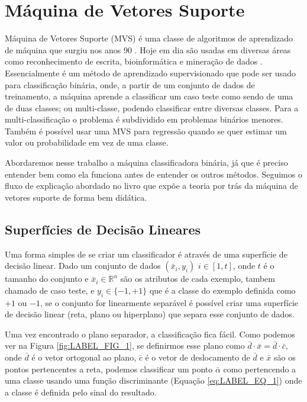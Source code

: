 \chapter{Máquina de Vetores Suporte}\label{chp:LABEL_CHP_2}


Máquina de Vetores Suporte (MVS) é uma classe de algoritmos de aprendizado de máquina que surgiu nos anos 90 \cite{cortes1995support}. Hoje em dia são usadas em diversas áreas como reconhecimento de escrita, bioinformática e mineração de dados \cite{defilippo2004maquinas}. Essencialmente é um método de aprendizado supervisionado que pode ser usado para classificação binária, onde, a partir de um conjunto de dados de treinamento, a máquina aprende a classificar um caso teste como sendo de uma de duas classes; ou multi-classe, podendo classificar entre diversas classes. Para a multi-classificação o problema é subdividido em problemas binários menores. Também é possível usar uma MVS para regressão quando se quer estimar um valor ou probabilidade em vez de uma classe. 

Abordaremos nesse trabalho a máquina classificadora binária, já que é preciso entender bem como ela funciona antes de entender os outros métodos. Seguimos o fluxo de explicação abordado no livro \cite{art:LIVRO_SVM} que expõe a teoria por trás da máquina de vetores suporte de forma bem didática.

\section{Superfícies de Decisão Lineares}
Uma forma simples de se criar um classificador é através de uma superfície de decisão linear. Dado um conjunto de dados $(\bar{x}_i,y_i)$ $i\in[1,t]$, onde $t$ é o tamanho do conjunto e $\bar{x}_i \in \mathbb{R}^n$ são os atributos de cada exemplo, tambem chamado de caso teste, e $y_i \in \{ -1,+1 \}$ que é a classe do exemplo definida como $+1$ ou $-1$, se o conjunto for linearmente separável é possível criar uma superfície de decisão linear (reta, plano ou hiperplano) que separa esse conjunto de dados.

Uma vez encontrado o plano separador, a classificação fica fácil. Como podemos ver na Figura \ref{fig:LABEL_FIG_1}, se definirmos esse plano como $\bar{d}\cdot \bar{x} = \bar{d}\cdot \bar{c}$, onde $\bar{d}$ é o vetor ortogonal ao plano, $\bar{c}$ é o vetor de deslocamento de $\bar{d}$ e $\bar{x}$ são os pontos pertencentes a reta, podemos classificar um ponto $\bar{\alpha}$ como pertencendo a uma classe usando uma função discriminante (Equação \ref{eq:LABEL_EQ_1}) onde a classe é definida pelo sinal do resultado.

